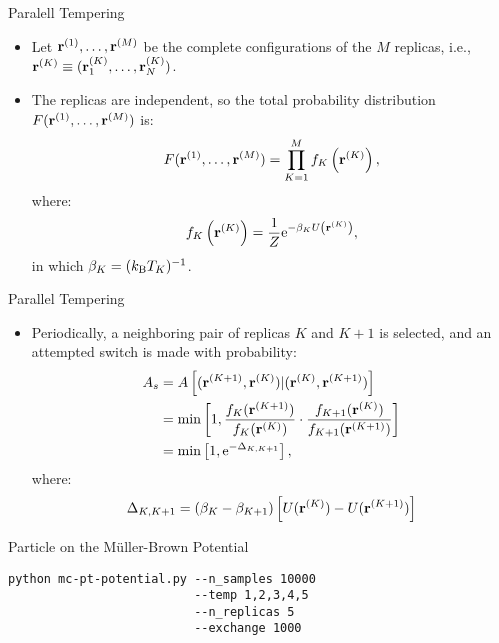 \documentclass[10pt]{beamer}
\begin{document}
\begin{frame}{Paralell Tempering}
\begin{itemize}
\setlength\itemsep{1em}
  \item Let ${\bf r}^{(1)}, \dots, {\bf r}^{(M)}$ be the complete configurations of the $M$ replicas, i.e., ${\bf r}^{(K)} \equiv ({\bf r}_1^{(K)}, \dots, {\bf r}_N^{(K)})$.

  \item The replicas are independent, so the total probability distribution $F({\bf r}^{(1)}, \dots, {\bf r}^{(M)})$ is:
  \begin{equation}
    F({\bf r}^{(1)}, \dots, {\bf r}^{(M)}) = \prod_{K=1}^{M} f_K\left( {\bf r}^{(K)} \right),
  \end{equation}
  where:
  \begin{equation}
    f_K\left( {\bf r}^{(K)} \right) = \frac{1}{Z} \mathrm{e}^{-\beta_K U\left( {\bf r}^{(K)} \right)},
  \end{equation}
  in which $\beta_K = (k_\mathrm{B}T_K)^{-1}$.
\end{itemize}
\end{frame}

\begin{frame}{Parallel Tempering}
\begin{itemize}
\setlength\itemsep{1em}
  \item Periodically, a neighboring pair of replicas $K$ and $K+1$ is selected, and an attempted switch is made with probability:
  \begin{align}
    A_s &= A\left[ ({\bf r}^{(K+1)}, {\bf r}^{(K)}) | ({\bf r}^{(K)}, {\bf r}^{(K+1)}) \right] \\
        &= \min\left[ 1, \frac{f_K({\bf r}^{(K+1)})}{f_K({\bf r}^{(K)})} \cdot \frac{f_{K+1}({\bf r}^{(K)})}{f_{K+1}({\bf r}^{(K+1)})} \right] \\
    &= \min\left[ 1, \mathrm{e}^{-\Delta_{K,K+1}} \right],
  \end{align}
  where:
  \begin{equation}
    \Delta_{K,K+1} = (\beta_K - \beta_{K+1}) \left[ U({\bf r}^{(K)}) - U({\bf r}^{(K+1)}) \right]
  \end{equation}
\end{itemize}
\end{frame}

\begin{frame}[fragile]{Particle on the M\"uller-Brown Potential}
\begin{lstlisting}
python mc-pt-potential.py --n_samples 10000
                          --temp 1,2,3,4,5
                          --n_replicas 5
                          --exchange 1000
\end{lstlisting}
\end{frame}
\end{document}
